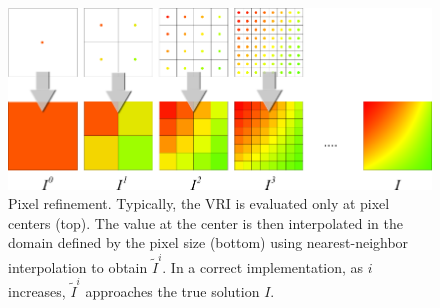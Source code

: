 \begin{figure}[b]
\centering
\includegraphics[width=0.95\linewidth]{chapter5/figures/pixel-size-convergence.png}
\caption{\label{fig:pixel_size_refinement} Pixel refinement. Typically, the VRI is evaluated
only at pixel centers (top). The value at the center is then interpolated in the domain defined by the pixel size (bottom) using
nearest-neighbor interpolation to obtain $\tilde{I}^i$. In a correct
implementation, as $i$ increases, $\tilde{I}^i$ approaches the true
solution $I$.}
\end{figure}



